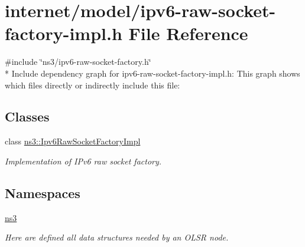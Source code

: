 \hypertarget{ipv6-raw-socket-factory-impl_8h}{}\section{internet/model/ipv6-\/raw-\/socket-\/factory-\/impl.h File Reference}
\label{ipv6-raw-socket-factory-impl_8h}
{\ttfamily \#include \char`\"{}ns3/ipv6-\/raw-\/socket-\/factory.\+h\char`\"{}}\\*
Include dependency graph for ipv6-\/raw-\/socket-\/factory-\/impl.h\+:
This graph shows which files directly or indirectly include this file\+:
\subsection*{Classes}
\begin{DoxyCompactItemize}
\item 
class \hyperlink{classns3_1_1Ipv6RawSocketFactoryImpl}{ns3\+::\+Ipv6\+Raw\+Socket\+Factory\+Impl}
\begin{DoxyCompactList}\small\item\em Implementation of I\+Pv6 raw socket factory. \end{DoxyCompactList}\end{DoxyCompactItemize}
\subsection*{Namespaces}
\begin{DoxyCompactItemize}
\item 
 \hyperlink{namespacens3}{ns3}
\begin{DoxyCompactList}\small\item\em Here are defined all data structures needed by an O\+L\+SR node. \end{DoxyCompactList}\end{DoxyCompactItemize}
